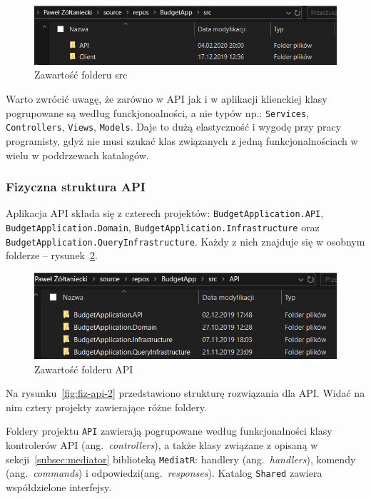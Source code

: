 \begin{figure}[t]
	\centering
	\includegraphics[width=.7\linewidth]{rys04/struktura-fizyczna-2.PNG}
	\caption{Zawartość folderu src}
	\label{fig:fiz-2}
\end{figure}

Warto zwrócić uwagę, że zarówno w API jak i w aplikacji klienckiej klasy pogrupowane są według funckjonoalności, a nie typów np.: \texttt{Services}, \texttt{Controllers}, \texttt{Views}, \texttt{Models}. Daje to dużą elastyczność i wygodę przy pracy programisty, gdyż nie musi szukać klas związanych z jedną funkcjonalnościach w wielu w poddrzewach katalogów.

\subsubsection{Fizyczna struktura API}

Aplikacja API składa się z czterech projektów: \texttt{BudgetApplication.API}, \texttt{BudgetApplication.Domain}, \texttt{BudgetApplication.Infrastructure} oraz \texttt{BudgetApplication.QueryInfrastructure}. Każdy z nich znajduje się w osobnym folderze -- rysunek~\ref{fig:fiz-api-1}.

\begin{figure}[t]
	\centering
	\includegraphics[width=.7\linewidth]{rys04/struktura-fizyczna-api-1.PNG}
	\caption{Zawartość folderu API}
	\label{fig:fiz-api-1}
\end{figure}

Na rysunku~\ref{fig:fiz-api-2} przedstawiono strukturę rozwiązania dla API. Widać na nim cztery projekty zawierające różne foldery. 

Foldery projektu \texttt{API} zawierają pogrupowane według funkcjonalności klasy kontrolerów API (ang.~\emph{controllers}), a także klasy związane z opisaną w sekcji~\ref{subsec:mediator} biblioteką \texttt{MediatR}: handlery (ang.~\emph{handlers}), komendy (ang.~\emph{commands}) i odpowiedzi(ang.~\emph{responses}). Katalog \texttt{Shared} zawiera współdzielone interfejsy. 

